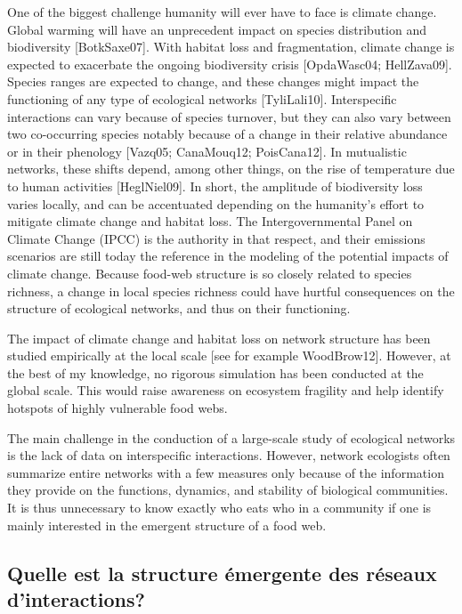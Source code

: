 One of the biggest challenge humanity will ever have to face is climate change.
Global warming will have an unprecedent impact on species distribution and
biodiversity [BotkSaxe07]. With habitat loss and fragmentation, climate change
is expected to exacerbate the ongoing biodiversity crisis [OpdaWasc04;
HellZava09]. Species ranges are expected to change, and these changes might
impact the functioning of any type of ecological networks [TyliLali10].
Interspecific interactions can vary because of species turnover, but they can
also vary between two co-occurring species notably because of a change in their
relative abundance or in their phenology [Vazq05; CanaMouq12; PoisCana12]. In
mutualistic networks, these shifts depend, among other things, on the rise of
temperature due to human activities [HeglNiel09]. In short, the amplitude of
biodiversity loss varies locally, and can be accentuated depending on the
humanity's effort to mitigate climate change and habitat loss. The
Intergovernmental Panel on Climate Change (IPCC) is the authority in that
respect, and their emissions scenarios are still today the reference in the
modeling of the potential impacts of climate change. Because food-web structure
is so closely related to species richness, a change in local species richness
could have hurtful consequences on the structure of ecological networks, and
thus on their functioning.

The impact of climate change and habitat loss on network structure has been
studied empirically at the local scale [see for example WoodBrow12]. However,
at the best of my knowledge, no rigorous simulation has been conducted at the
global scale. This would raise awareness on ecosystem fragility and help
identify hotspots of highly vulnerable food webs.

The main challenge in the conduction of a large-scale study of ecological
networks is the lack of data on interspecific interactions. However, network
ecologists often summarize entire networks with a few measures only because of
the information they provide on the functions, dynamics, and stability of
biological communities. It is thus unnecessary to know exactly who eats who in a
community if one is mainly interested in the emergent structure of a food web.


\subsection{Quelle est la structure émergente des réseaux d'interactions?} 

